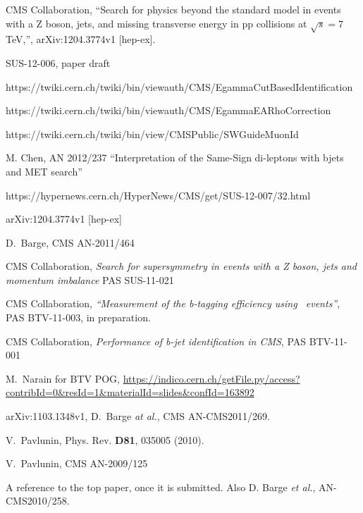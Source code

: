 \begin{thebibliography}{10}

 CMS Collaboration, ``Search for physics beyond the standard model in events with a Z boson, jets, and missing transverse energy in pp collisions at $\sqrt{s} = 7$ TeV,'', 	arXiv:1204.3774v1 [hep-ex].

 SUS-12-006, paper draft

 https://twiki.cern.ch/twiki/bin/viewauth/CMS/EgammaCutBasedIdentification

 https://twiki.cern.ch/twiki/bin/viewauth/CMS/EgammaEARhoCorrection

 https://twiki.cern.ch/twiki/bin/view/CMSPublic/SWGuideMuonId

 M. Chen, AN 2012/237 ``Interpretation of the Same-Sign di-leptons with bjets and MET search''







 https://hypernews.cern.ch/HyperNews/CMS/get/SUS-12-007/32.html

 	arXiv:1204.3774v1 [hep-ex]

 D.~Barge, CMS AN-2011/464

 CMS Collaboration, {{\it Search for supersymmetry in events with a Z boson, jets and momentum imbalance}} PAS SUS-11-021

 CMS Collaboration, {{\it ``Measurement of the b-tagging efficiency using \ttbar\ events''}}, 
	PAS BTV-11-003, in preparation.

 CMS Collaboration, {{\it Performance of b-jet identification in CMS}}, PAS BTV-11-001

 M.~Narain for BTV POG, \url{https://indico.cern.ch/getFile.py/access?contribId=0&resId=1&materialId=slides&confId=163892}

 arXiv:1103.1348v1, D.~Barge {\em at al.}, CMS AN-CMS2011/269.

 V.~Pavlunin, Phys. Rev. {\bf D81}, 035005 (2010).
    
 V.~Pavlunin, CMS AN-2009/125

 A reference to the top paper, once it is submitted.  Also
D. Barge {\em et al.}, AN-CMS2010/258.  


\end{thebibliography}

